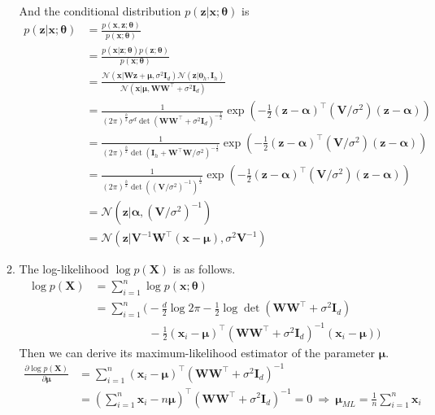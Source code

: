 \documentclass[11pt]{article}
\begin{document}
\begin{enumerate}
\begin{enumerate}
\begin{align*}
    \end{align*}
    And the conditional distribution $p(\bm z|\bm x;\bm\theta)$ is
    \begin{align*}
    p(\bm z|\bm x;\bm\theta)
    &= \frac{p(\bm x,\bm z;\bm\theta)}{p(\bm x;\bm\theta)} \\
    &= \frac{p(\bm x|\bm z;\bm\theta)p(\bm z;\bm\theta)}{p(\bm x;\bm\theta)} \\
    &= \frac{\mathcal{N}(\bm x|\bm W\bm z+\bm\mu,\sigma^2\bm I_{d})\mathcal{N}(\bm z|\bm 0_{h},\bm I_{h})}{\mathcal{N}(\bm x|\bm\mu,\bm W\bm W^{\top}+\sigma^2\bm I_d)} \\
    &= \frac{1}{(2\pi)^\frac{h}{2}\sigma^d\det\left(\bm W\bm W^{\top}+\sigma^2\bm I_d\right)^{-\frac{1}{2}}}\exp\left(-\frac{1}{2}(\bm z-\bm\alpha)^{\top}(\bm V/\sigma^2)(\bm z-\bm\alpha)\right) \\
    &= \frac{1}{(2\pi)^\frac{h}{2}\det(\bm I_h+\bm W^{\top}\bm W/\sigma^2)^{-\frac{1}{2}}}\exp\left(-\frac{1}{2}(\bm z-\bm\alpha)^{\top}(\bm V/\sigma^2)(\bm z-\bm\alpha)\right) \\
    &= \frac{1}{(2\pi)^\frac{h}{2}\det((\bm V/\sigma^2)^{-1})^\frac{1}{2}}\exp\left(-\frac{1}{2}(\bm z-\bm\alpha)^{\top}(\bm V/\sigma^2)(\bm z-\bm\alpha)\right) \\
    &= \mathcal{N}(\bm z|\bm\alpha,(\bm V/\sigma^2)^{-1}) \\
    &= \mathcal{N}(\bm z|\bm V^{-1}\bm W^{\top}(\bm x-\bm\mu),\sigma^2\bm V^{-1})
    \end{align*}
    
    \item
    The log-likelihood $\log p(\bm X)$ is as follows.
    \begin{align*}
    \log p(\bm X) &= \sum_{i=1}^{n}\log p(\bm x;\bm\theta) \\
    &= \sum_{i=1}^{n}\bigg(-\frac{d}{2}\log 2\pi-\frac{1}{2}\log\det(\bm W\bm W^{\top}+\sigma^2\bm I_d) \\
    &\hspace{2cm} -\frac{1}{2}(\bm x_i-\bm\mu)^{\top}\left(\bm W\bm W^{\top}+\sigma^2\bm I_d\right)^{-1}(\bm x_i-\bm\mu)\bigg)
    \end{align*}
    Then we can derive its maximum-likelihood estimator of the parameter $\bm\mu$.
    \begin{align*}
    \frac{\partial\log p(\bm X)}{\partial\bm\mu}
    &= \sum_{i=1}^{n}(\bm x_i-\bm\mu)^{\top}\left(\bm W\bm W^{\top}+\sigma^2\bm I_d\right)^{-1} \\
    &= \left(\sum_{i=1}^{n}\bm x_i-n\bm\mu\right)^{\top}\left(\bm W\bm W^{\top}+\sigma^2\bm I_d\right)^{-1}=0 \ \Rightarrow\ \bm\mu_{ML}=\frac{1}{n}\sum_{i=1}^{n}\bm x_i
    \end{align*}
    

\end{enumerate}
\end{enumerate}
\end{document}
